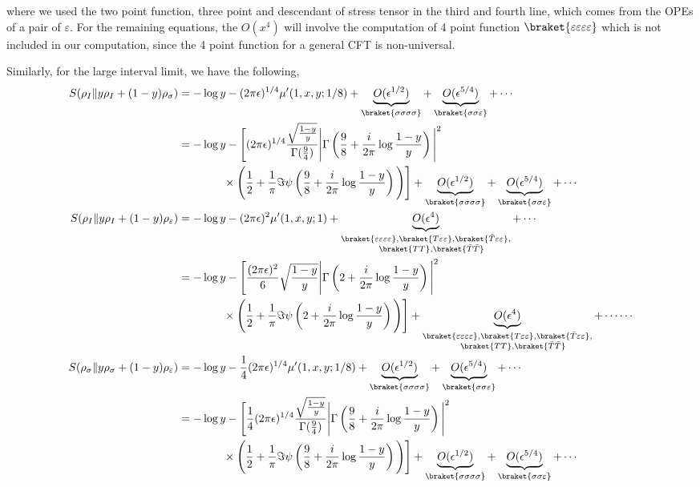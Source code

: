 \documentclass[11pt]{article}
\newcommand{\ep}{\epsilon}
\newcommand{\nn}{\nonumber}
\newcommand{\lb}{\left(}
\newcommand{\rb}{\right)}
\begin{document}
where we used the two point function, three point and descendant of stress tensor in the third and fourth line, which comes from the OPEs of a pair of $\varepsilon$. For the remaining equations, the $O(x^4)$ will involve the computation of 4 point function $\braket{\varepsilon\varepsilon\varepsilon\varepsilon}$
which is not included in our computation, since the 4 point function for a general CFT is non-universal.

Similarly, for the large interval limit, we have the following,
\begin{align}
    S(\rho_I \| y \rho_I + (1-y)\rho_\sigma) &= -\log y - (2\pi \ep)^{1/4} \mu'(1,x,y;1/8)+ \underbrace{O(\ep^{1/2})}_{\braket{\sigma\sigma\sigma\sigma}}+ \underbrace{O(\ep^{5/4})}_{\braket{\sigma\sigma\varepsilon}}+\cdots \\
    &= -\log y  -\Bigg[ (2\pi \ep)^{1/4}\frac{\sqrt\frac{1-y}{y}}{\Gamma(\frac{9}{4})}\Bigg| \Gamma\lb \frac{9}{8} + \frac{i}{2\pi}\log \frac{1-y}{y}\rb \Bigg|^2 \nn\\
    &\qquad\qquad\times\Bigg( \frac{1}{2} + \frac{1}{\pi}\Im \psi \lb \frac{9}{8}+ \frac{i}{2\pi}\log \frac{1-y}{y}\rb\Bigg)\Bigg]+ \underbrace{O(\ep^{1/2})}_{\braket{\sigma\sigma\sigma\sigma}}+ \underbrace{O(\ep^{5/4})}_{\braket{\sigma\sigma\varepsilon}}+\cdots \\
    S(\rho_I \| y \rho_I + (1-y)\rho_\varepsilon) &= -\log y - (2\pi \ep)^{2} \mu'(1,x,y;1)+ \underbrace{O(\ep^{4})}_{\substack{\braket{\varepsilon\varepsilon\varepsilon\varepsilon} ,\braket{T\varepsilon\varepsilon}, \braket{\bar T \varepsilon\varepsilon},\\\quad \braket{TT},\braket{\bar T \bar T}}}+\cdots\\
    &=  -\log y  - \Bigg[\frac{(2\pi \ep)^{2}}{6}\sqrt \frac{1-y}{y}\Bigg| \Gamma\lb 2 + \frac{i}{2\pi}\log \frac{1-y}{y}\rb \Bigg|^2 \nn\\
    &\qquad\qquad \times\Bigg( \frac{1}{2} + \frac{1}{\pi}\Im \psi \lb 2+ \frac{i}{2\pi}\log \frac{1-y}{y}\rb\Bigg)\Bigg]+ \underbrace{O(\ep^{4})}_{\substack{\braket{\varepsilon\varepsilon\varepsilon\varepsilon} ,\braket{T\varepsilon\varepsilon}, \braket{\bar T \varepsilon\varepsilon},\\\quad \braket{TT},\braket{\bar T \bar T}}}+\cdots \cdots \\
    S(\rho_\sigma \| y \rho_\sigma + (1-y)\rho_\varepsilon) &= -\log y -  \frac{1}{4}(2\pi \ep)^{1/4} \mu'(1,x,y;1/8)+ \underbrace{O(\ep^{1/2})}_{\braket{\sigma\sigma\sigma\sigma}} +\underbrace{O(\ep^{5/4})}_{\braket{\sigma\sigma\varepsilon}} +\cdots\\
    &= -\log y  -\Bigg[ \frac{1}{4}(2\pi \ep)^{1/4}\frac{\sqrt\frac{1-y}{y}}{\Gamma(\frac{9}{4})}\Bigg| \Gamma\lb \frac{9}{8} + \frac{i}{2\pi}\log \frac{1-y}{y}\rb \Bigg|^2 \nn\\
    &\qquad\qquad
    \times\Bigg( \frac{1}{2} + \frac{1}{\pi}\Im \psi \lb \frac{9}{8}+ \frac{i}{2\pi}\log \frac{1-y}{y}\rb\Bigg)\Bigg] + \underbrace{O(\ep^{1/2})}_{\braket{\sigma\sigma\sigma\sigma}} +\underbrace{O(\ep^{5/4})}_{\braket{\sigma\sigma\varepsilon}}+\cdots 
\end{align}
\end{document}
